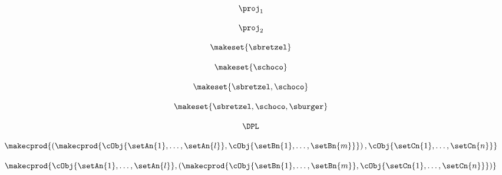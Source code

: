 {\begin{forslides}
        \begin{equation}
            \label{eq:parallelism-154}
            \proj_1
        \end{equation}

        \begin{equation}
            \label{eq:parallelism-155}
            \proj_2
        \end{equation}

        \begin{equation}
            \label{eq:parallelism-156}
            \makeset{ \sbretzel }
        \end{equation}

        \begin{equation}
            \label{eq:parallelism-157}
            \makeset{ \schoco }
        \end{equation}

        \begin{equation}
            \label{eq:parallelism-158}
            \makeset{ \sbretzel, \schoco }
        \end{equation}

        \begin{equation}
            \label{eq:parallelism-159}
            \makeset{ \sbretzel, \schoco, \sburger }
        \end{equation}

        \begin{equation}
            \label{eq:parallelism-160}
            \DPL
        \end{equation}

        \begin{equation}
            \label{eq:parallelism-161}
            \makecprod{
                \left ( \makecprod{\cObj{\setAn{1}, \ldots, \setAn{l}}, \cObj{\setBn{1}, \ldots, \setBn{m}}} \right )
                ,
                \cObj{\setCn{1}, \ldots, \setCn{n}}
            }
        \end{equation}

        \begin{equation}
            \label{eq:parallelism-162}
            \makecprod{
                \cObj{\setAn{1}, \ldots, \setAn{l}},
                \left (
                \makecprod{
                    \cObj{\setBn{1}, \ldots, \setBn{m}},
                    \cObj{\setCn{1}, \ldots, \setCn{n}}
                }
                \right )
            }
        \end{equation}


\end{forslides}}
